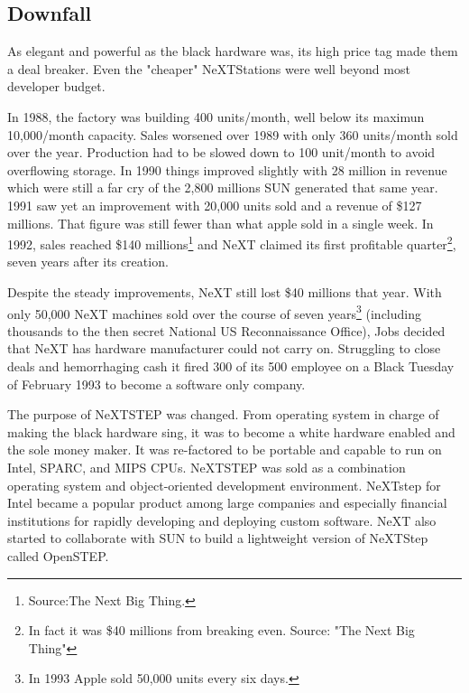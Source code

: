 \subsection{Downfall}
As elegant and powerful as the black hardware was, its high price tag made them a deal breaker. Even the "cheaper" NeXTStations were well beyond most developer budget.\\
\par
 In 1988, the factory was building 400 units/month, well below its maximun 10,000/month capacity. Sales worsened over 1989 with only 360 units/month sold over the year. Production had to be slowed down to 100 unit/month to avoid overflowing storage. In 1990 things improved slightly with 28 million in revenue which were still a far cry of the 2,800 millions SUN generated that same year. 1991 saw yet an improvement with 20,000 units sold and a revenue of \$127 millions. That figure was still fewer than what apple sold in a single week. In 1992, sales reached \$140 millions\footnote{Source:The Next Big Thing.} and NeXT claimed its first profitable quarter\footnote{In fact it was \$40 millions from breaking even. Source: "The Next Big Thing"}, seven years after its creation.\\
\par
Despite the steady improvements, NeXT still lost \$40 millions that year. With only 50,000 NeXT machines sold over the course of seven years\footnote{In 1993 Apple sold 50,000 units every six days.} (including thousands to the then secret National US Reconnaissance Office), Jobs decided that NeXT has hardware manufacturer could not carry on. Struggling to close deals and hemorrhaging cash it fired 300 of its 500 employee on a Black Tuesday of February 1993 to become a software only company.\\
\par
 The purpose of NeXTSTEP was changed. From operating system in charge of making the black hardware sing, it was to become a white hardware enabled and the sole money maker. It was re-factored to be portable and capable to run on Intel, SPARC, and MIPS CPUs. NeXTSTEP was sold as a combination operating system and object-oriented development environment. NeXTstep for Intel became a popular product among large companies and especially financial institutions for rapidly developing and deploying custom software. NeXT also started to collaborate with SUN to build a lightweight version of NeXTStep called OpenSTEP.\\
\par


